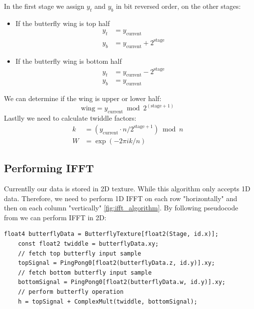 In the first stage we assign $y_t$ and $y_b$ in bit reversed order, on the other stages:
\begin{itemize}
    \item If the butterfly wing is top half
    \begin{equation}
        \begin{split}
            y_t &= y_{\text{current}} \\
            y_b &= y_{\text{current}} + 2^{\text{stage}}
        \end{split}
    \end{equation}
    \item If the butterfly wing is bottom half
    \begin{equation}
        \begin{split}
            y_t &= y_{\text{current}} - 2^{\text{stage}} \\
            y_b &= y_{\text{current}}
        \end{split}
    \end{equation}
\end{itemize}
We can determine if the wing is upper or lower half:
\begin{equation}
    \text{wing} = y_{\text{current}} \bmod 2^{(\text{stage} + 1)}
\end{equation}
Lastlly we need to calculate twiddle factors:
\begin{equation}
    \begin{split}
        k &= (y_{\text{current}} \cdot n / 2^{\text{stage} + 1}) \bmod n \\
        W &= \exp(-2\pi i k / n)
    \end{split}
\end{equation}

\subsection{Performing IFFT}
Currentlly our data is stored in 2D texture. While this algorithm only accepts 1D data. Therefore, we need to perform 1D IFFT on each row "horizontally" and then on each column "vertically" \ref{fig:ifft_algorithm}.
By following pseudocode from \cite{flugge2017} we can perform IFFT in 2D:

\begin{lstlisting}[caption={Horizontal Butterfly Operation}, frame=single, numberstyle=\small\color{gray}, captionpos=b]
    float4 butterflyData = ButterflyTexture[float2(Stage, id.x)];
    const float2 twiddle = butterflyData.xy;
    // fetch top butterfly input sample
    topSignal = PingPong0[float2(butterflyData.z, id.y)].xy;
    // fetch bottom butterfly input sample
    bottomSignal = PingPong0[float2(butterflyData.w, id.y)].xy;
    // perform butterfly operation
    h = topSignal + ComplexMult(twiddle, bottomSignal);
\end{lstlisting}

